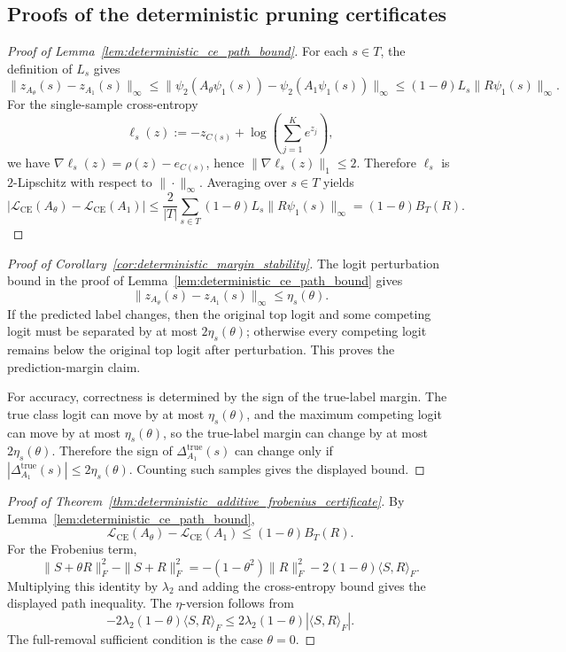 \documentclass[11pt]{article}
\theoremstyle{plain}
\theoremstyle{definition}
\theoremstyle{remark}
\newcommand{\1}{\mathbf{1}}
\begin{document}
\subsection{Proofs of the deterministic pruning certificates}

\begin{proof}[Proof of Lemma~\ref{lem:deterministic_ce_path_bound}]
For each \(s\in T\), the definition of \(L_s\) gives
\[
\|z_{A_\theta}(s)-z_{A_1}(s)\|_\infty
\le
\| \psi_2(A_\theta\psi_1(s))-\psi_2(A_1\psi_1(s))\|_\infty
\le
(1-\theta)L_s\|R\psi_1(s)\|_\infty.
\]
For the single-sample cross-entropy
\[
\ell_s(z):=-z_{C(s)}+\log\!\left(\sum_{j=1}^K e^{z_j}\right),
\]
we have \(\nabla\ell_s(z)=\rho(z)-e_{C(s)}\), hence \(\|\nabla\ell_s(z)\|_1\le2\). Therefore \(\ell_s\) is \(2\)-Lipschitz with respect to \(\|\cdot\|_\infty\). Averaging over \(s\in T\) yields
\[
\left|
\mathcal L_{\mathrm{CE}}(A_\theta)-\mathcal L_{\mathrm{CE}}(A_1)
\right|
\le
\frac2{|T|}\sum_{s\in T}(1-\theta)L_s\|R\psi_1(s)\|_\infty
=
(1-\theta)B_T(R).
\]
\end{proof}

\begin{proof}[Proof of Corollary~\ref{cor:deterministic_margin_stability}]
The logit perturbation bound in the proof of Lemma~\ref{lem:deterministic_ce_path_bound} gives
\[
\|z_{A_\theta}(s)-z_{A_1}(s)\|_\infty\le\eta_s(\theta).
\]
If the predicted label changes, then the original top logit and some competing logit must be separated by at most \(2\eta_s(\theta)\); otherwise every competing logit remains below the original top logit after perturbation. This proves the prediction-margin claim.

For accuracy, correctness is determined by the sign of the true-label margin. The true class logit can move by at most \(\eta_s(\theta)\), and the maximum competing logit can move by at most \(\eta_s(\theta)\), so the true-label margin can change by at most \(2\eta_s(\theta)\). Therefore the sign of \(\Delta_{A_1}^{\mathrm{true}}(s)\) can change only if \(|\Delta_{A_1}^{\mathrm{true}}(s)|\le2\eta_s(\theta)\). Counting such samples gives the displayed bound.
\end{proof}

\begin{proof}[Proof of Theorem~\ref{thm:deterministic_additive_frobenius_certificate}]
By Lemma~\ref{lem:deterministic_ce_path_bound},
\[
\mathcal L_{\mathrm{CE}}(A_\theta)-\mathcal L_{\mathrm{CE}}(A_1)
\le
(1-\theta)B_T(R).
\]
For the Frobenius term,
\[
\|S+\theta R\|_F^2-\|S+R\|_F^2
=
-(1-\theta^2)\|R\|_F^2
-2(1-\theta)\langle S,R\rangle_F.
\]
Multiplying this identity by \(\lambda_2\) and adding the cross-entropy bound gives the displayed path inequality. The \(\eta\)-version follows from
\[
-2\lambda_2(1-\theta)\langle S,R\rangle_F
\le
2\lambda_2(1-\theta)|\langle S,R\rangle_F|.
\]
The full-removal sufficient condition is the case \(\theta=0\).
\end{proof}
\end{document}
